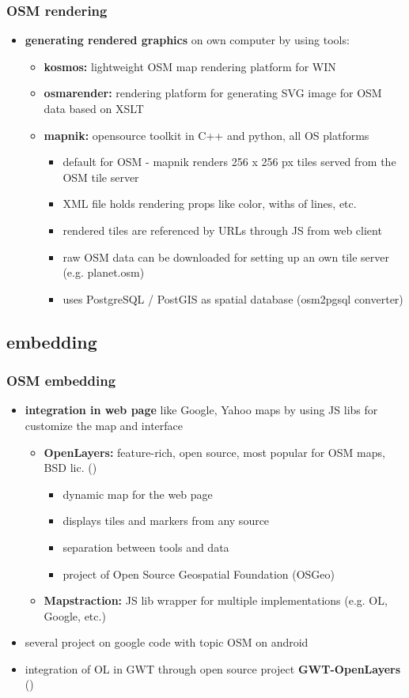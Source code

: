 \documentclass[blue]{beamer}
\begin{document}
\frame
{
\frametitle{\textbf{OSM rendering}}
\begin{itemize}
\item \textbf{generating rendered graphics} on own computer by using tools:
	\begin{itemize}
			\item \textbf{kosmos:} lightweight OSM map rendering platform for WIN
			\item \textbf{osmarender:} rendering platform for generating SVG image for OSM data based on XSLT
			\item \textbf{mapnik:} opensource toolkit in C++ and python, all OS platforms
			\begin{itemize}
				\item default for OSM - mapnik renders 256 x 256 px tiles served from the OSM tile server
				\item XML file holds rendering props like color, withs of lines, etc.
				\item rendered tiles are referenced by URLs through JS from web client
				\item raw OSM data can be downloaded for setting up an own tile server (e.g. planet.osm)
				\item uses PostgreSQL / PostGIS as spatial database (osm2pgsql converter)
		\end{itemize}
	\end{itemize}
\end{itemize}
}

\subsection{embedding}
\frame
{
\frametitle{\textbf{OSM embedding}}
\begin{itemize}
	\item \textbf{integration in web page} like Google, Yahoo maps by using JS libs for customize the map and interface
	\begin{itemize}
		\item \textbf{OpenLayers:} feature-rich, open source, most popular for OSM maps, BSD lic. ()
		\begin{itemize}
			\item dynamic map for the web page
			\item displays tiles and markers from any source
			\item separation between tools and data
			\item project of Open Source Geospatial Foundation (OSGeo)
		\end{itemize}
		\item \textbf{Mapstraction:} JS lib wrapper for multiple implementations (e.g. OL, Google, etc.)
	\end{itemize}
	\item several project on google code with topic OSM on android
	\item integration of OL in GWT through open source project \textbf{GWT-OpenLayers} ()
\end{itemize}
}
\end{document}
